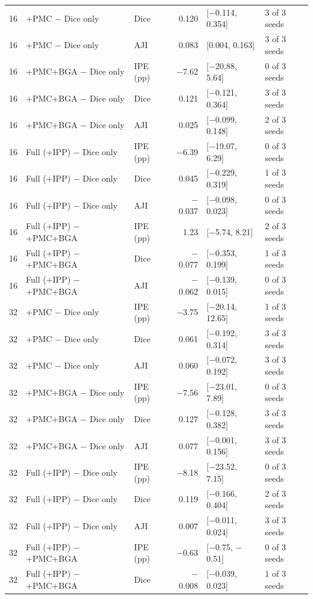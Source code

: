 \documentclass[10pt]{article}
\begin{document}
\begin{landscape}
{\begin{longtable}{r l l r l l}
16 & +PMC $-$ Dice only & Dice & 0.120 & [$-$0.114, 0.354] & 3 of 3 seeds \\
16 & +PMC $-$ Dice only & AJI & 0.083 & [0.004, 0.163] & 3 of 3 seeds \\
16 & +PMC+BGA $-$ Dice only & IPE (pp) & $-$7.62 & [$-$20.88, 5.64] & 0 of 3 seeds \\
16 & +PMC+BGA $-$ Dice only & Dice & 0.121 & [$-$0.121, 0.364] & 3 of 3 seeds \\
16 & +PMC+BGA $-$ Dice only & AJI & 0.025 & [$-$0.099, 0.148] & 2 of 3 seeds \\
16 & Full (+IPP) $-$ Dice only & IPE (pp) & $-$6.39 & [$-$19.07, 6.29] & 0 of 3 seeds \\
16 & Full (+IPP) $-$ Dice only & Dice & 0.045 & [$-$0.229, 0.319] & 1 of 3 seeds \\
16 & Full (+IPP) $-$ Dice only & AJI & $-$0.037 & [$-$0.098, 0.023] & 0 of 3 seeds \\
16 & Full (+IPP) $-$ +PMC+BGA & IPE (pp) & 1.23 & [$-$5.74, 8.21] & 2 of 3 seeds \\
16 & Full (+IPP) $-$ +PMC+BGA & Dice & $-$0.077 & [$-$0.353, 0.199] & 1 of 3 seeds \\
16 & Full (+IPP) $-$ +PMC+BGA & AJI & $-$0.062 & [$-$0.139, 0.015] & 0 of 3 seeds \\
32 & +PMC $-$ Dice only & IPE (pp) & $-$3.75 & [$-$20.14, 12.65] & 1 of 3 seeds \\
32 & +PMC $-$ Dice only & Dice & 0.061 & [$-$0.192, 0.314] & 3 of 3 seeds \\
32 & +PMC $-$ Dice only & AJI & 0.060 & [$-$0.072, 0.192] & 3 of 3 seeds \\
32 & +PMC+BGA $-$ Dice only & IPE (pp) & $-$7.56 & [$-$23.01, 7.89] & 0 of 3 seeds \\
32 & +PMC+BGA $-$ Dice only & Dice & 0.127 & [$-$0.128, 0.382] & 3 of 3 seeds \\
32 & +PMC+BGA $-$ Dice only & AJI & 0.077 & [$-$0.001, 0.156] & 3 of 3 seeds \\
32 & Full (+IPP) $-$ Dice only & IPE (pp) & $-$8.18 & [$-$23.52, 7.15] & 0 of 3 seeds \\
32 & Full (+IPP) $-$ Dice only & Dice & 0.119 & [$-$0.166, 0.404] & 2 of 3 seeds \\
32 & Full (+IPP) $-$ Dice only & AJI & 0.007 & [$-$0.011, 0.024] & 3 of 3 seeds \\
32 & Full (+IPP) $-$ +PMC+BGA & IPE (pp) & $-$0.63 & [$-$0.75, $-$0.51] & 0 of 3 seeds \\
32 & Full (+IPP) $-$ +PMC+BGA & Dice & $-$0.008 & [$-$0.039, 0.023] & 1 of 3 seeds \\

\end{longtable}}
\end{landscape}
\end{document}
